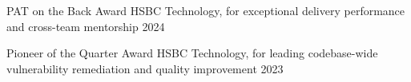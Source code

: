 

\begin{cvhonors}

  \cvhonor
    {PAT on the Back Award} %
    {HSBC Technology, for exceptional delivery performance and cross-team mentorship} %
    {} %
    {2024} %

  \cvhonor
    {Pioneer of the Quarter Award} %
    {HSBC Technology, for leading codebase-wide vulnerability remediation and quality improvement} %
    {} %
    {2023} %






\end{cvhonors}
